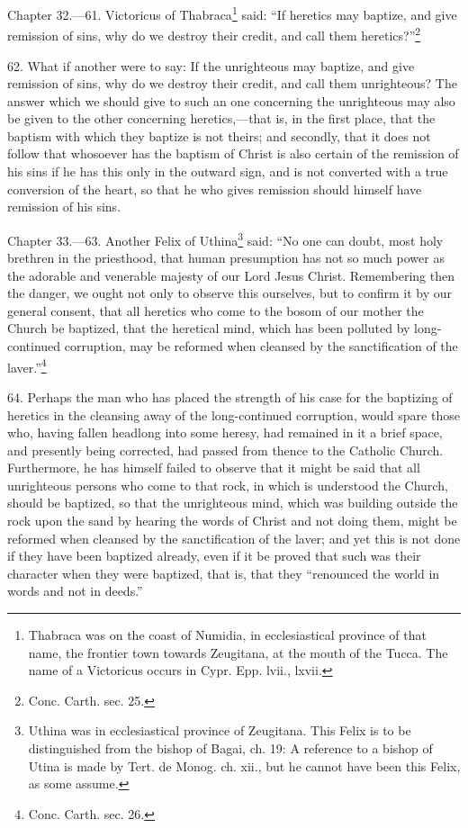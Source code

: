 
Chapter 32.—61. Victoricus of Thabraca\footnote{\par  Thabraca was on the coast of Numidia, in ecclesiastical province of that name, the frontier town towards Zeugitana, at the mouth of the Tucca. The name of a Victoricus occurs in Cypr. Epp. lvii., lxvii.} said: ``If heretics may baptize, and give remission of sins, why do we destroy their credit, and call them heretics?''\footnote{\par  Conc. Carth. sec. 25.}

62. What if another were to say: If the unrighteous may baptize, and give remission of sins, why do we destroy their credit, and call them unrighteous? The answer which we should give to such an one concerning the unrighteous may also be given to the other concerning heretics,—that is, in the first place, that the baptism with which they baptize is not theirs; and secondly, that it does not follow that whosoever has the baptism of Christ is also certain of the remission of his sins if he has this only in the outward sign, and is not converted with a true conversion of the heart, so that he who gives remission should himself have remission of his sins.


Chapter 33.—63. Another Felix of Uthina\footnote{\par  Uthina was in ecclesiastical province of Zeugitana. This Felix is to be distinguished from the bishop of Bagai, ch. 19: A reference to a bishop of Utina is made by Tert. de Monog. ch. xii., but he cannot have been this Felix, as some assume.} said: ``No one can doubt, most holy brethren in the priesthood, that human presumption has not so much power as the adorable and venerable majesty of our Lord Jesus Christ. Remembering then the danger, we ought not only to observe this ourselves, but to confirm it by our general consent, that all heretics who come to the bosom of our mother the Church be baptized, that the heretical mind, which has been polluted by long-continued corruption, may be reformed when cleansed by the sanctification of the laver.''\footnote{\par  Conc. Carth. sec. 26.}

64. Perhaps the man who has placed the strength of his case for the baptizing of heretics in the cleansing away of the long-continued corruption, would spare those who, having fallen headlong into some heresy, had remained in it a brief space, and presently being corrected, had passed from thence to the Catholic Church. Furthermore, he has himself failed to observe that it might be said that all unrighteous persons who come to that rock, in which is understood the Church, should be baptized, so that the unrighteous mind, which was building outside the rock upon the sand by hearing the words of Christ and not doing them, might be reformed when cleansed by the sanctification of the laver; and yet this is not done if they have been baptized already, even if it be proved that such was their character when they were baptized, that is, that they ``renounced the world in words and not in deeds.''

